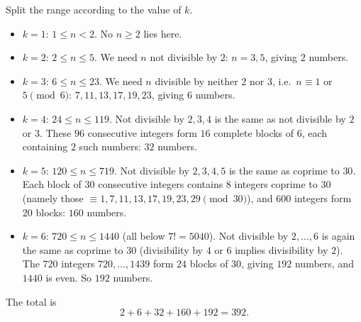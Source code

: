 Split the range according to the value of $k$.

\begin{itemize}
\item $k=1$: $1\le n<2$. No $n\ge2$ lies here.
\item $k=2$: $2\le n\le 5$. We need $n$ not divisible by $2$: $n=3,5$, giving $2$ numbers.
\item $k=3$: $6\le n\le 23$. We need $n$ divisible by neither $2$ nor $3$, i.e.\ $n\equiv 1$ or $5\pmod 6$: $7,11,13,17,19,23$, giving $6$ numbers.
\item $k=4$: $24\le n\le 119$. Not divisible by $2,3,4$ is the same as not divisible by $2$ or $3$. These $96$ consecutive integers form $16$ complete blocks of $6$, each containing $2$ such numbers: $32$ numbers.
\item $k=5$: $120\le n\le 719$. Not divisible by $2,3,4,5$ is the same as coprime to $30$. Each block of $30$ consecutive integers contains $8$ integers coprime to $30$ (namely those $\equiv 1,7,11,13,17,19,23,29\pmod{30}$), and $600$ integers form $20$ blocks: $160$ numbers.
\item $k=6$: $720\le n\le 1440$ (all below $7!=5040$). Not divisible by $2,\dots,6$ is again the same as coprime to $30$ (divisibility by $4$ or $6$ implies divisibility by $2$). The $720$ integers $720,\dots,1439$ form $24$ blocks of $30$, giving $192$ numbers, and $1440$ is even. So $192$ numbers.
\end{itemize}
The total is
\[
2+6+32+160+192=\boxed{392}.
\]
